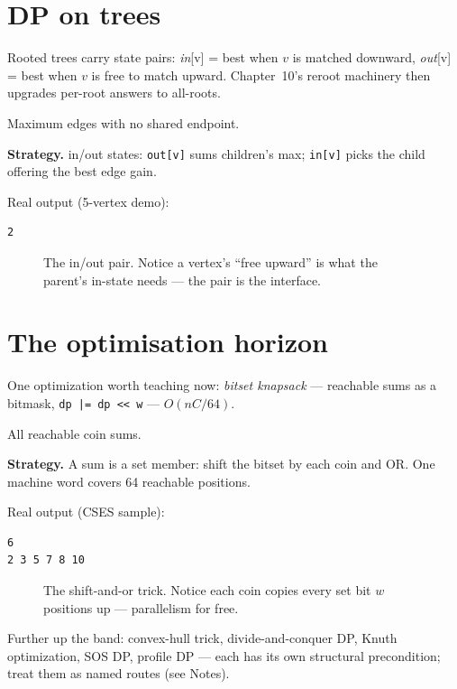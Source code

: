 \section{DP on trees}\label{sec:treedp}
Rooted trees carry state pairs: \emph{in}[v] = best when $v$ is
matched downward, \emph{out}[v] = best when $v$ is free to match
upward. Chapter~10's reroot machinery then upgrades per-root answers
to all-roots.
\begin{example}\label{ex:tmatch}
Maximum edges with no shared endpoint.
\par\smallskip
\textbf{Strategy.} in/out states: \texttt{out[v]} sums children's
max; \texttt{in[v]} picks the child offering the best edge gain.
\par\smallskip
\begin{solution}

Real output (5-vertex demo):
\begin{lstlisting}[numbers=none]
2
\end{lstlisting}
\end{solution}
\end{example}
\begin{figure}[ht]\centering

\caption{The in/out pair. Notice a vertex's ``free upward'' is what
the parent's in-state needs --- the pair is the interface.}
\label{fig:treestate}
\end{figure}

\section{The optimisation horizon}\label{sec:horizon}
One optimization worth teaching now: \emph{bitset knapsack} ---
reachable sums as a bitmask, \texttt{dp |= dp << w} --- $O(nC/64)$.
\begin{example}\label{ex:money}
All reachable coin sums.
\par\smallskip
\textbf{Strategy.} A sum is a set member: shift the bitset by each
coin and OR. One machine word covers 64 reachable positions.
\par\smallskip
\begin{solution}

Real output (CSES sample):
\begin{lstlisting}[numbers=none]
6
2 3 5 7 8 10
\end{lstlisting}
\end{solution}
\end{example}
\begin{figure}[ht]\centering

\caption{The shift-and-or trick. Notice each coin copies every
set bit $w$ positions up --- parallelism for free.}
\label{fig:bitset}
\end{figure}
Further up the band: convex-hull trick, divide-and-conquer DP,
Knuth optimization, SOS DP, profile DP --- each has its own
structural precondition; treat them as named routes (see Notes).

